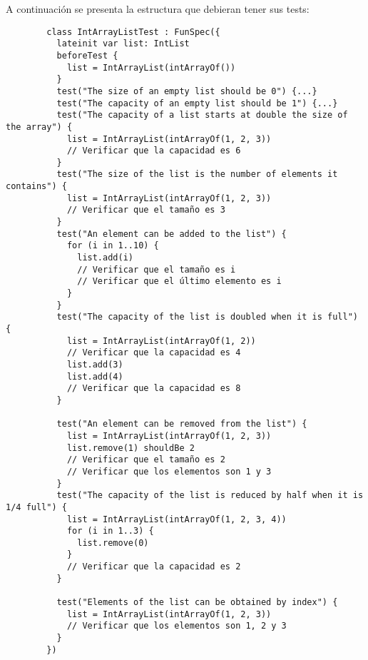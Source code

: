 \begin{Exercise}[title={Listas}]
    \ExeText A continuación se presenta la estructura que debieran tener sus tests:
      \begin{verbatim}
        class IntArrayListTest : FunSpec({
          lateinit var list: IntList
          beforeTest {
            list = IntArrayList(intArrayOf())
          }
          test("The size of an empty list should be 0") {...}
          test("The capacity of an empty list should be 1") {...}
          test("The capacity of a list starts at double the size of the array") {
            list = IntArrayList(intArrayOf(1, 2, 3))
            // Verificar que la capacidad es 6
          }
          test("The size of the list is the number of elements it contains") {
            list = IntArrayList(intArrayOf(1, 2, 3))
            // Verificar que el tamaño es 3
          }
          test("An element can be added to the list") {
            for (i in 1..10) {
              list.add(i)
              // Verificar que el tamaño es i
              // Verificar que el último elemento es i
            }
          }
          test("The capacity of the list is doubled when it is full") {
            list = IntArrayList(intArrayOf(1, 2))
            // Verificar que la capacidad es 4
            list.add(3)
            list.add(4)
            // Verificar que la capacidad es 8
          }

          test("An element can be removed from the list") {
            list = IntArrayList(intArrayOf(1, 2, 3))
            list.remove(1) shouldBe 2
            // Verificar que el tamaño es 2
            // Verificar que los elementos son 1 y 3
          }
          test("The capacity of the list is reduced by half when it is 1/4 full") {
            list = IntArrayList(intArrayOf(1, 2, 3, 4))
            for (i in 1..3) {
              list.remove(0)
            }
            // Verificar que la capacidad es 2
          }

          test("Elements of the list can be obtained by index") {
            list = IntArrayList(intArrayOf(1, 2, 3))
            // Verificar que los elementos son 1, 2 y 3
          }
        })
      \end{verbatim}
  \end{Exercise}

